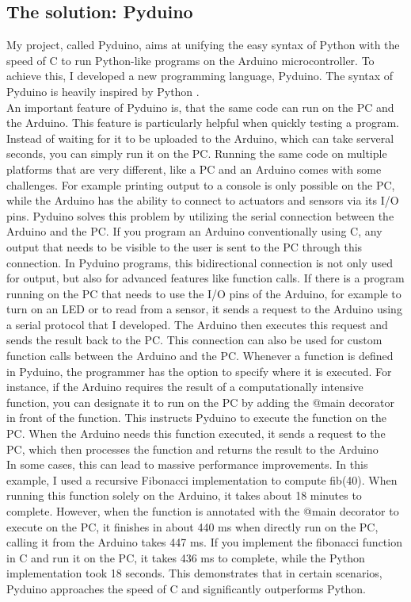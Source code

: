 \documentclass{article}
\begin{document}
\begin{multicols}{2}
\section{The solution: Pyduino}
\noindent My project, called Pyduino, aims at unifying the easy syntax of Python with the speed of C to run Python-like programs on the Arduino microcontroller. To achieve this, I developed a new programming language, Pyduino. The syntax of Pyduino is heavily inspired by Python \cite{Q2}. \\
An important feature of Pyduino is, that the same code can run on the PC and the Arduino. This feature is particularly helpful when quickly testing a program. Instead of waiting for it to be uploaded to the Arduino, which can take serveral seconds, you can simply run it on the PC.
Running the same code on multiple platforms that are very different, like a PC and an Arduino comes with some challenges. For example printing output to a console is only possible on the PC, while the Arduino has the ability to connect to actuators and sensors via its I/O pins.
Pyduino solves this problem by utilizing the serial connection between the Arduino and the PC. If you program an Arduino conventionally using C, any output that needs to be visible to the user is sent to the PC through this connection.
 In Pyduino programs, this bidirectional connection is not only used for output, but also for advanced features like function calls. If there is a program running on the PC that needs to use the I/O pins of the Arduino, for example to turn on an LED or to read from a sensor, it sends a request to the Arduino using a serial protocol that I developed. The Arduino then executes this request and sends the result back to the PC. This connection can also be used for custom function calls between the Arduino and the PC. Whenever a function is defined in Pyduino, the programmer has the option to specify where it is executed. 
 For instance, if the Arduino requires the result of a computationally intensive function, you can designate it to run on the PC by adding the @main decorator in front of the function. This instructs Pyduino to execute the function on the PC. When the Arduino needs this function executed, it sends a request to the PC, which then processes the function and returns the result to the Arduino\\
In some cases, this can lead to massive performance improvements. 
In this example, I used a recursive Fibonacci implementation to compute fib(40). When running this function solely on the Arduino, it takes about 18 minutes to complete. However, when the function is annotated with the @main decorator to execute on the PC, it finishes in about 440 ms when directly run on the PC, calling it from the Arduino takes 447 ms. If you implement the fibonacci function in C and run it on the PC, it takes 436 ms to complete, while the Python implementation took 18 seconds. This demonstrates that in certain scenarios, Pyduino approaches the speed of C and significantly outperforms Python. \\

\end{multicols}
\end{document}
